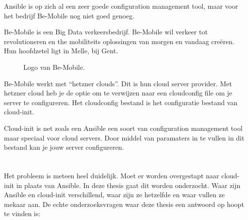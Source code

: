 Ansible is op zich al een zeer goede configuration management tool, maar voor het bedrijf Be-Mobile nog niet goed genoeg. 

Be-Mobile is een Big Data verkeersbedrijf. Be-Mobile wil verkeer tot revolutioneren en the mobiliteits oplossingen van morgen en vandaag creëren. Hun hoofdzetel ligt in Melle, bij Gent. 
\begin{figure}[!htb]
    \caption{Logo van Be-Mobile.}
    \label{fig:bemobile}
\end{figure}

\newpage
Be-Mobile werkt met “hetzner clouds”. Dit is hun cloud server provider. Met hetzner cloud heb je de optie om te verwijzen naar een cloudconfig file om je server te configureren. Het cloudconfig bestand is het configuratie  bestand van cloud-init. 

Cloud-init is net zoals een Ansible een soort van configuration management tool maar speciaal voor cloud servers. Door middel van paramaters in te vullen in dit bestand kan je jouw server configureren.
 


\section{}
\label{sec:probleemstellingonderzoeksvraag}

Het probleem is meteen heel duidelijk. Moet er worden overgestapt naar cloud-init in plaats van Ansible. In deze thesis gaat dit worden onderzocht. Waar zijn Ansible en cloud-init verschillend, waar zijn ze hetzelfde en waar vullen ze mekaar aan. De echte onderzoeksvragen waar deze thesis een antwoord op hoopt te vinden is:


